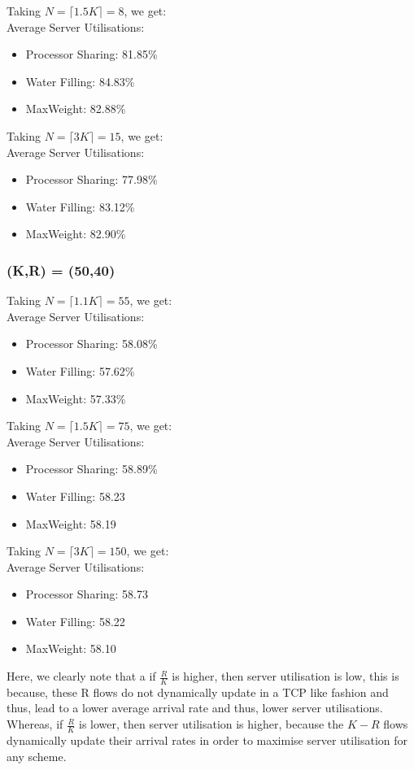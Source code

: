 \documentclass[11pt, a4paper]{article}
\begin{document}
Taking $N=\lceil 1.5K \rceil=8$, we get:\\
Average Server Utilisations:
\begin{itemize}
\item Processor Sharing: 81.85\%
\item Water Filling: 84.83\%
\item MaxWeight: 82.88\%
\end{itemize}

Taking $N=\lceil 3K \rceil=15$, we get:\\
Average Server Utilisations:
\begin{itemize}
\item Processor Sharing: 77.98\%
\item Water Filling: 83.12\%
\item MaxWeight: 82.90\%
\end{itemize}

\subsubsection{(K,R) = (50,40)}
Taking $N=\lceil 1.1K \rceil=55$, we get:\\
Average Server Utilisations:
\begin{itemize}
\item Processor Sharing: 58.08\%
\item Water Filling: 57.62\%
\item MaxWeight: 57.33\%
\end{itemize}

Taking $N=\lceil 1.5K \rceil=75$, we get:\\
Average Server Utilisations:
\begin{itemize}
\item Processor Sharing: 58.89\%
\item Water Filling: 58.23%
\item MaxWeight: 58.19%
\end{itemize}

Taking $N=\lceil 3K \rceil=150$, we get:\\
Average Server Utilisations:
\begin{itemize}
\item Processor Sharing: 58.73%
\item Water Filling: 58.22%
\item MaxWeight: 58.10%
\end{itemize}

Here, we clearly note that a if $\frac{R}{K}$ is higher, then server utilisation is low, this is because, these R flows do not dynamically update in a TCP like fashion and thus, lead to a lower average arrival rate and thus, lower server utilisations. Whereas, if $\frac{R}{K}$ is lower, then server utilisation is higher, because the $K-R$ flows dynamically update their arrival rates in order to maximise server utilisation for any scheme. 
\end{document}
